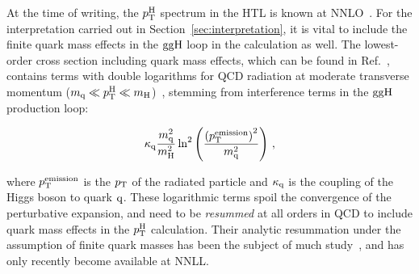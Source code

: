 At the time of writing, the $p_\mathrm{T}^\mathrm{H}$ spectrum in the HTL is known at NNLO~\cite{Boughezal:2015dra,Boughezal:2015aha,Chen:2016zka}.
% 
For the interpretation carried out in Section~\ref{sec:interpretation}, it is vital to include the finite quark mass effects in the $\mathrm{g}\mathrm{g}\mathrm{H}$ loop in the calculation as well.
% 
The lowest-order cross section including quark mass effects, which can be found in Ref.~\cite{Ellis:1987xu}, contains terms with double logarithms for QCD radiation at moderate transverse momentum ($m_{\mathrm{q}} \ll p_\mathrm{T}^\mathrm{H} \ll m_{\mathrm{H}}$)~\cite{Baur:1989cm,Bishara:2016jga}, stemming from interference terms in the $\mathrm{g}\mathrm{g}\mathrm{H}$ production loop:
% 
\begin{linenomath*}
\begin{equation}
\kappa_{\mathrm{q}} \frac{m_{\mathrm{q}}^2}{m_{\mathrm{H}}^2}
    \ln^2 \left(
        \frac{
            \left( p_\mathrm{T}^\text{emission} \right)^2
            }{
            m_\mathrm{q}^2
            }
        \right)
\,,
\end{equation}
\end{linenomath*}
% 
where $p_\mathrm{T}^\text{emission}$ is the $p_\mathrm{T}$ of the radiated particle and $\kappa_{\mathrm{q}}$ is the coupling of the Higgs boson to quark $\mathrm{q}$.
% 
These logarithmic terms spoil the convergence of the perturbative expansion, and need to be \textit{resummed} at all orders in QCD to include quark mass effects in the $p_\mathrm{T}^\mathrm{H}$ calculation.
% 
Their analytic resummation under the assumption of finite quark masses has been the subject of much study~\cite{Bozzi:2003jy,Becher:2010tm,Mantler:2012bj,Grazzini:2013mca,Monni:2016ktx}, and has only recently become available at NNLL.


